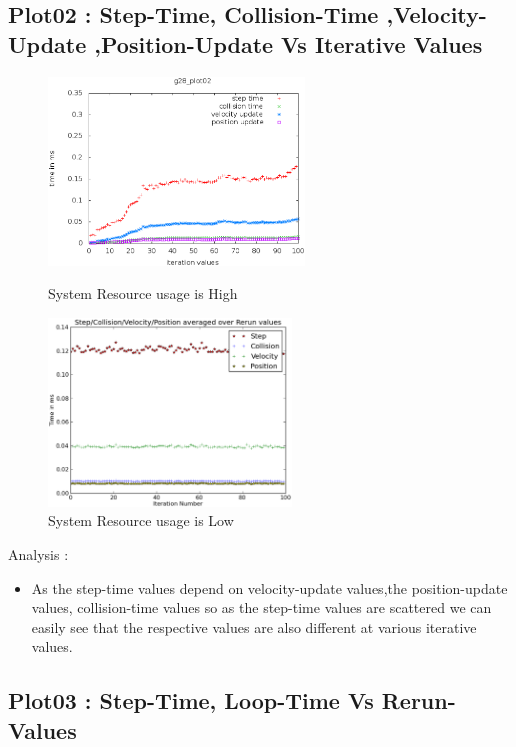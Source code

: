 \documentclass[a4paper,11pt]{article}
\begin{document}
\subsection{Plot02 : Step-Time, Collision-Time ,Velocity-Update ,Position-Update Vs Iterative Values }
	\begin{figure}[ht]
	\begin{minipage}[ht]{0.5\linewidth}
	\includegraphics[height=50mm]{plots/g28_project_plot02.eps}
	\caption{System Resource usage is High }		
	\end{minipage}	
	\begin{minipage}[ht]{0.5\linewidth}
	\includegraphics[height=50mm]{plots1/g28_project_plot02.eps}
	\caption{System Resource usage is Low }		
	\end{minipage}	
	\end{figure}
	Analysis :
\begin{itemize}
\item As the step-time values depend on velocity-update values,the position-update 
 values, collision-time values so as the step-time values are scattered we can easily     
 see that the respective values are also  different at various iterative values.
\end{itemize}
\pagebreak
\subsection{Plot03 : Step-Time, Loop-Time Vs Rerun-Values }
\end{document}

